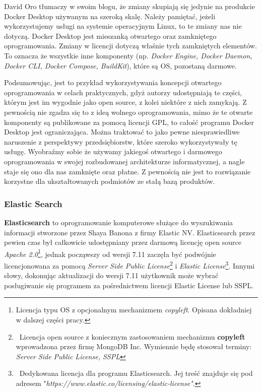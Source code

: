 \documentclass{article}
\begin{document}
David Oro tłumaczy w swoim blogu, że zmiany skupiają się jedynie na produkcie Docker Desktop używanym na szeroką skalę. Należy pamiętać, jeżeli wykorzystujemy usługi na systemie operacyjnym Linux, to te zmiany nas nie dotyczą. Docker Desktop jest mieszanką otwartego oraz zamkniętego oprogramowania. Zmiany w licencji dotyczą właśnie tych zamkniętych elementów. To oznacza że wszystkie inne komponenty (np. \emph{Docker Engine, Docker Daemon, Docker CLI, Docker Compose, BuildKit}), które są OS, pozostaną darmowe\cite{docker.oro}.

Podsumowując, jest to przykład wykorzystywania koncepcji otwartego oprogramowania w celach praktycznych, gdyż autorzy udostępniają te części, którym jest im wygodnie jako open source, z kolei niektóre z nich zamykają. Z pewnością nie zgadza się to z ideą wolnego oprogramowania, mimo że te otwarte komponenty są publikowane za pomocą licencji GPL, to całość programu Docker Desktop jest ograniczająca\cite{docker.licensing}. Można traktować to jako pewne niesprawiedliwe naruszenie z perspektywy przedsiębiorstw, które szeroko wykorzystywały tę usługę. Wyobraźmy sobie że używamy jakiegoś otwartego i darmowego oprogramowania w swojej rozbudowanej architekturze informatycznej, a nagle staje się ono dla nas zamknięte oraz płatne. Z pewnością nie jest to rozwiązanie korzystne dla ukształtowanych podmiotów ze stałą bazą produktów.

\subsubsection{Elastic Search}

\hspace{4mm} \textbf{Elasticsearch} to oprogramowanie komputerowe służące do wyszukiwania informacji stworzone przez Shaya Banona z firmy Elastic NV\cite{elastic.def}. Elasticsearch przez pewien czas był całkowicie udostępniany przez darmową licencję open source \emph{Apache 2.0}\footnote{Licencja typu OS z opcjonalnym mechanizmem \emph{copyleft}. Opisana dokładniej w dalszej części pracy.}, jednak począwszy od wersji 7.11 zaczęła być podwójnie licencjonowana za pomocą \emph{Server Side Public License}\footnote{\, Licencja open source z koniecznym zastosowaniem mechanizmu \textbf{copyleft} wprowadzona przez firmę MongoDB Inc\cite{sspl.wiki}. Wymiennie będę stosował terminy: \emph{Server Side Public License, SSPL}} i \emph{Elastic License}\footnote{\, Dedykowana licencja dla programu Elasticsearch. Jej treść znajduje się pod adresem "\emph{https://www.elastic.co/licensing/elastic-license"}\cite{elastic.license}.}. Innymi słowy, dokonując aktualizacji do wersji 7.11 użytkownik może wybrać posługiwanie się programem za pośrednictwem licencji Elastic License lub SSPL\cite{linux.polska}. 
\end{document}
